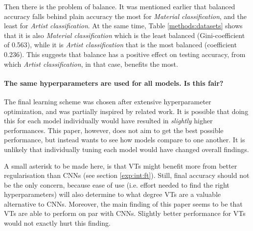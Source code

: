 Then there is the problem of balance. It was mentioned earlier that balanced accuracy falls behind plain accuracy the most for \textit{Material classification}, and the least for \textit{Artist classification}. At the same time, Table \ref{methods:datasets} shows that it is also \textit{Material classification} which is the least balanced (Gini-coefficient of 0.563), while it is \textit{Artist classification} that is the most balanced (coefficient 0.236). This suggests that balance has a positive effect on testing accuracy, from which \textit{Artist classification}, in that case, benefits the most.


\paragraph{The same hyperparameters are used for all models. Is this fair?}
The final learning scheme was chosen after extensive hyperparameter optimization, and was partially inspired by related work. It is possible that doing this for each model individually would have resulted in \textit{slightly} higher performances. This paper, however, does not aim to get the best possible performance, but instead wants to see how models compare to one another. It is unlikely that individually tuning each model would have changed overall findings.

A small asterisk to be made here, is that VTs might benefit more from better regularisation than CNNs (see section \ref{exp:int:ft}). Still, final accuracy should not be the only concern, because ease of use (i.e. effort needed to find the right hyperparameters) will also determine to what degree VTs are a valuable alternative to CNNs. Moreover, the main finding of this paper seems to be that VTs are able to perform on par with CNNs. Slightly better performance for VTs would not exactly hurt this finding.

